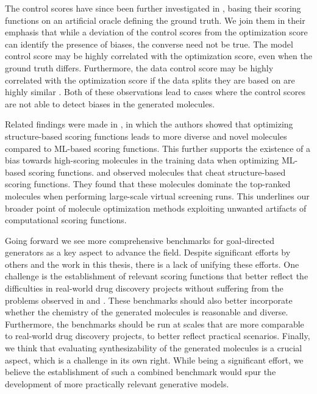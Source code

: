 The control scores have since been further investigated in \citep{gendreauMolecularAssaysSimulator2023},
basing their scoring functions on an artificial oracle defining the ground truth. We join them in
their emphasis that while a deviation of the control scores from the optimization score can identify
the presence of biases, the converse need not be true. The model control score may be highly
correlated with the optimization score, even when the ground truth differs. Furthermore, the data
control score may be highly correlated with the optimization score if the data splits they are based
on are highly similar \citep{langevinExplainingAvoidingFailure2022}. Both of these observations lead
to cases where the control scores are not able to detect biases in the generated molecules.

Related findings were made in \citep{thomasReevaluatingSampleEfficiency2022}, in which the authors
showed that optimizing structure-based scoring functions leads to more diverse and novel molecules
compared to \ac{ML}-based scoring functions. This further supports the existence of a bias towards
high-scoring molecules in the training data when optimizing \ac{ML}-based scoring functions.
\citet{lyuModelingExpansionVirtual2023} and \citet{wuIdentifyingArtifactsLarge2024} observed
molecules that cheat structure-based scoring functions. They found that these molecules dominate the
top-ranked molecules when performing large-scale virtual screening runs. This underlines our broader
point of molecule optimization methods exploiting unwanted artifacts of computational scoring
functions.

Going forward we see more comprehensive benchmarks for goal-directed generators as a key aspect to
advance the field. Despite significant efforts by others
\citep{brownGuacaMolBenchmarkingModels2019,polykovskiyMolecularSetsMOSES2020,gaoSynthesizabilityMoleculesProposed2020,gaoSampleEfficiencyMatters2022,thomasMolScoreScoringEvaluation2024}
and the work in this thesis, there is a lack of unifying these efforts. One challenge is the
establishment of relevant scoring functions that better reflect the difficulties in real-world drug
discovery projects \citep{fromerComputeraidedMultiobjectiveOptimization2023} without suffering from
the problems observed in  and
\citep{lyuModelingExpansionVirtual2023,wuIdentifyingArtifactsLarge2024}. These benchmarks should
also better incorporate whether the chemistry of the generated molecules is reasonable
\citep{thomasReevaluatingSampleEfficiency2022} and diverse. Furthermore, the benchmarks should be
run at scales that are more comparable to real-world drug discovery projects, to better reflect
practical scenarios. Finally, we think that evaluating synthesizability of the generated molecules
is a crucial aspect, which is a challenge in its own right. While being a significant effort, we
believe the establishment of such a combined benchmark would spur the development of more
practically relevant generative models.

